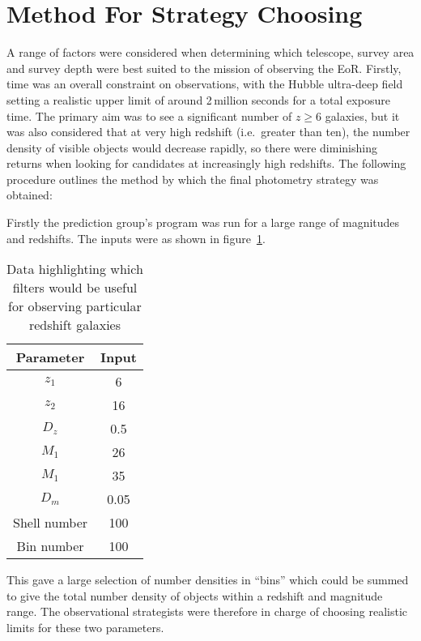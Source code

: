 
\section{Method For Strategy Choosing} %
\label{sec:method_for_strategy_choosing}
	A range of factors were considered when determining which telescope, survey area and survey depth were best suited to the mission of observing the EoR. Firstly, time was an overall constraint on observations, with the Hubble ultra-deep field setting a realistic upper limit of around 2\,million seconds for a total exposure time. The primary aim was to see a significant number of $z\ge6$ galaxies, but it was also considered that at very high redshift (i.e.\ greater than ten), the number density of visible objects would decrease rapidly, so there were diminishing returns when looking for candidates at increasingly high redshifts. The following procedure outlines the method by which the final photometry strategy was obtained:

	Firstly the prediction group’s program was run for a large range of magnitudes and redshifts. The inputs were as shown in figure~\ref{tab:program_inputs}.
	\begin{table}[ht]
		\begin{center}
			\begin{tabular}{c|c}
				Parameter 	& Input \\
				\hline \hline
				$z_1$ & 6 \\
				$z_2$ & 16 \\
				$D_z$ & 0.5 \\
				$M_1$ & 26 \\
				$M_1$ & 35 \\
				$D_m$ & 0.05 \\
				Shell number & 100 \\
				Bin number & 100
			\end{tabular}
		\end{center}
		\caption{Data highlighting which filters would be useful for observing particular redshift galaxies\cite{Galactic_Astronomy_Binney_Merrifield}\label{tab:program_inputs}}
	\end{table}

	This gave a large selection of number densities in ``bins'' which could be summed to give the total number density of objects within a redshift and magnitude range. The observational strategists were therefore in charge of choosing realistic limits for these two parameters.

